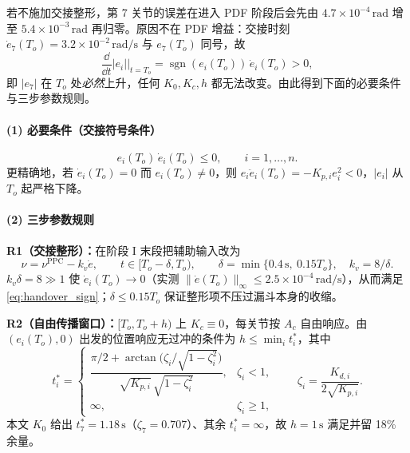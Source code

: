 若不施加交接整形，第 7 关节的误差在进入 PDF 阶段后会先由 \(4.7\times10^{-4}\,\mathrm{rad}\) 增至 \(5.4\times10^{-3}\,\mathrm{rad}\) 再归零。原因不在 PDF 增益：交接时刻 \(\dot e_7(T_o)=3.2\times10^{-2}\,\mathrm{rad/s}\) 与 \(e_7(T_o)\) 同号，故
\begin{equation}
\frac{\dd}{\dd t}\lvert e_i\rvert\Big|_{t=T_o}
=\operatorname{sgn}(e_i(T_o))\,\dot e_i(T_o)>0 ,
\label{eq:mono_necessary}
\end{equation}
即 \(\lvert e_7\rvert\) 在 \(T_o\) 处\emph{必然}上升，任何 \(K_0,K_c,h\) 都无法改变。由此得到下面的必要条件与三步参数规则。

\paragraph{(1) 必要条件（交接符号条件）}
\begin{equation}
e_i(T_o)\,\dot e_i(T_o)\le0,\qquad i=1,\dots,n .
\label{eq:handover_sign}
\end{equation}
更精确地，若 \(\dot e_i(T_o)=0\) 而 \(e_i(T_o)\neq0\)，则 \(e_i\ddot e_i(T_o)=-K_{p,i}e_i^2<0\)，\(\lvert e_i\rvert\) 从 \(T_o\) 起严格下降。

\paragraph{(2) 三步参数规则}
\textbf{R1（交接整形）：}在阶段 I 末段把辅助输入改为
\begin{equation}
\nu=\nu^{\mathrm{PPC}}-k_v\dot e,\qquad t\in[T_o-\delta,T_o),
\qquad \delta=\min\{0.4\,\mathrm s,\ 0.15T_o\},\quad k_v=8/\delta .
\label{eq:handover_damp}
\end{equation}
\(k_v\delta=8\gg1\) 使 \(\dot e_i(T_o)\to0\)（实测 \(\lVert\dot e(T_o)\rVert_\infty\le2.5\times10^{-4}\,\mathrm{rad/s}\)），从而满足 \eqref{eq:handover_sign}；\(\delta\le0.15T_o\) 保证整形项不压过漏斗本身的收缩。

\textbf{R2（自由传播窗口）：}\([T_o,T_o+h)\) 上 \(K_c\equiv0\)，每关节按 \(A_c\) 自由响应。由 \((e_i(T_o),0)\) 出发的位置响应无过冲的条件为 \(h\le\min_i t_i^*\)，其中
\begin{equation}
t_i^*=\begin{cases}
\dfrac{\pi/2+\arctan\!\bigl(\zeta_i/\sqrt{1-\zeta_i^2}\bigr)}{\sqrt{K_{p,i}}\,\sqrt{1-\zeta_i^2}}, & \zeta_i<1,\\[6pt]
\infty, & \zeta_i\ge1,
\end{cases}
\qquad
\zeta_i=\frac{K_{d,i}}{2\sqrt{K_{p,i}}} .
\label{eq:tstar}
\end{equation}
本文 \(K_0\) 给出 \(t_7^*=1.18\,\mathrm s\)（\(\zeta_7=0.707\)）、其余 \(t_i^*=\infty\)，故 \(h=1\,\mathrm s\) 满足并留 18\% 余量。

